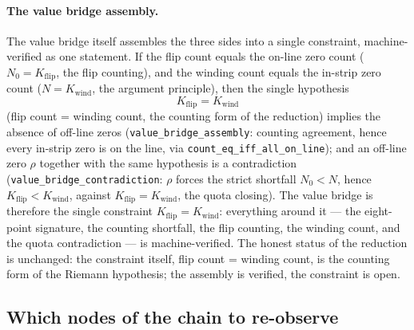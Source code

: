\documentclass{article}
\begin{document}
\paragraph{The value bridge assembly.}
The value bridge itself assembles the three sides into a single
constraint, machine-verified as one statement. If the flip count
equals the on-line zero count ($N_0=K_{\mathrm{flip}}$, the flip
counting), and the winding count equals the in-strip zero count
($N=K_{\mathrm{wind}}$, the argument principle), then the single
hypothesis
\begin{equation}
  K_{\mathrm{flip}} = K_{\mathrm{wind}}
\end{equation}
(flip count = winding count, the counting form of the reduction)
implies the absence of off-line zeros
(\texttt{value\_bridge\_assembly}: counting agreement, hence every
in-strip zero is on the line, via \texttt{count\_eq\_iff\_all\_on\_line});
and an off-line zero $\rho$ together with the same hypothesis is a
contradiction
(\texttt{value\_bridge\_contradiction}: $\rho$ forces the strict
shortfall $N_0<N$, hence $K_{\mathrm{flip}}<K_{\mathrm{wind}}$,
against $K_{\mathrm{flip}}=K_{\mathrm{wind}}$, the quota closing).
The value bridge is therefore the single constraint
$K_{\mathrm{flip}}=K_{\mathrm{wind}}$: everything around it --- the
eight-point signature, the counting shortfall, the flip counting, the
winding count, and the quota contradiction --- is machine-verified.
The honest status of the reduction is unchanged: the constraint
itself, flip count = winding count, is the counting form of the
Riemann hypothesis; the assembly is verified, the constraint is open.

\subsection{Which nodes of the chain to re-observe}
\label{sec:partIV:criteria}
\end{document}
